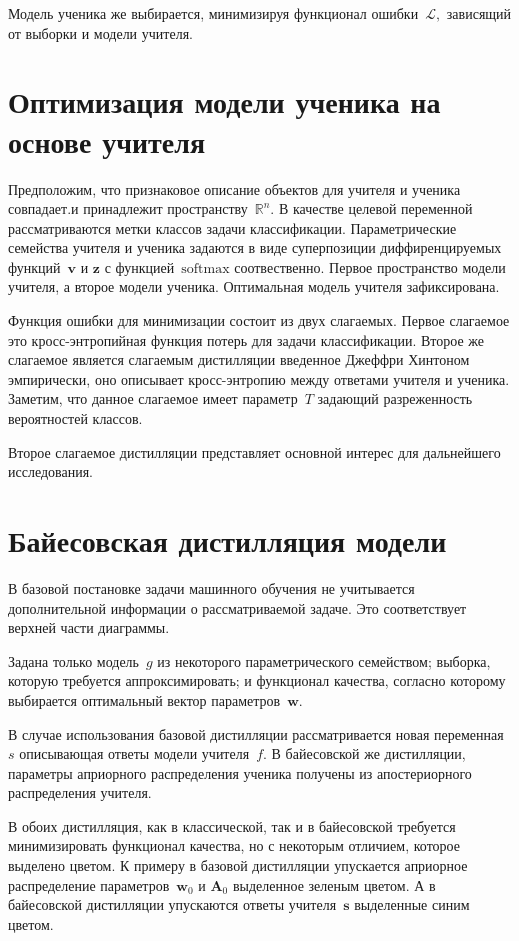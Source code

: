 \documentclass[10pt, twoside]{article}
\begin{document}
Модель ученика же выбирается, минимизируя функционал ошибки~$\mathcal{L},$ зависящий от выборки и модели учителя.

\section{Оптимизация модели ученика на основе учителя}
Предположим, что признаковое описание объектов для учителя и ученика совпадает.и принадлежит пространству~$\mathbb{R}^{n}.$
В качестве целевой переменной рассматриваются метки классов задачи классификации. Параметрические семейства учителя и ученика задаются в виде суперпозиции диффиренцируемых функций~$\mathbf{v}$ и $\mathbf{z}$ с функцией~$\text{softmax}$ соотвественно. Первое пространство модели учителя, а второе модели ученика. Оптимальная модель учителя зафиксирована.

Функция ошибки для минимизации состоит из двух слагаемых. Первое слагаемое это кросс-энтропийная функция потерь для задачи классификации. Второе же слагаемое является слагаемым дистилляции введенное Джеффри Хинтоном эмпирически, оно описывает кросс-энтропию между ответами учителя и ученика. Заметим, что данное слагаемое имеет параметр~$T$ задающий разреженность вероятностей классов.

Второе слагаемое дистилляции представляет основной интерес для дальнейшего исследования.

\section{Байесовская дистилляция модели}
В базовой постановке задачи машинного обучения не учитывается дополнительной информации о рассматриваемой задаче. Это соответствует верхней части диаграммы.

Задана только модель~$g$ из некоторого параметрического семейством; выборка, которую требуется аппроксимировать; и функционал качества, согласно которому выбирается оптимальный вектор параметров~$\mathbf{w}$.

В случае использования базовой дистилляции рассматривается новая переменная~$s$ описывающая ответы модели учителя~$f$. В байесовской же дистилляции, параметры априорного распределения ученика получены из апостериорного распределения учителя.

В обоих дистилляция, как в классической, так и в байесовской требуется минимизировать функционал качества, но с некоторым отличием, которое выделено цветом. К примеру в базовой дистилляции упускается априорное распределение параметров~$\mathbf{w}_0$ и $\mathbf{A}_0$ выделенное зеленым цветом. А в байесовской дистилляции упускаются ответы учителя~$\mathbf{s}$ выделенные синим цветом.
\end{document}
